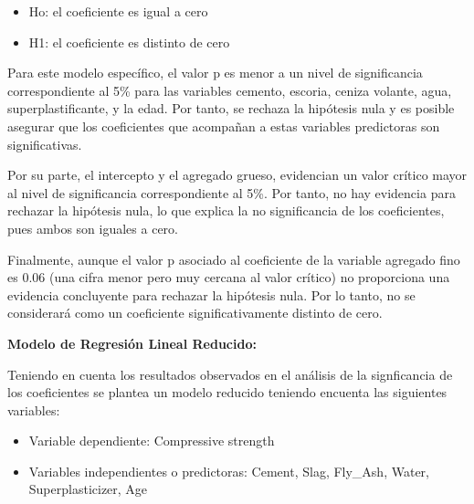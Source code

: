 \documentclass[11pt]{article}
\providecommand{\tightlist}{%
      \setlength{\itemsep}{0pt}\setlength{\parskip}{0pt}}
\begin{document}
\begin{itemize}
\tightlist
\item
  Ho: el coeficiente es igual a cero
\item
  H1: el coeficiente es distinto de cero
\end{itemize}

Para este modelo específico, el valor p es menor a un nivel de
significancia correspondiente al 5\% para las variables cemento,
escoria, ceniza volante, agua, superplastificante, y la edad. Por tanto,
se rechaza la hipótesis nula y es posible asegurar que los coeficientes
que acompañan a estas variables predictoras son significativas.

Por su parte, el intercepto y el agregado grueso, evidencian un valor
crítico mayor al nivel de significancia correspondiente al 5\%. Por
tanto, no hay evidencia para rechazar la hipótesis nula, lo que explica
la no significancia de los coeficientes, pues ambos son iguales a cero.

Finalmente, aunque el valor p asociado al coeficiente de la variable
agregado fino es 0.06 (una cifra menor pero muy cercana al valor
crítico) no proporciona una evidencia concluyente para rechazar la
hipótesis nula. Por lo tanto, no se considerará como un coeficiente
significativamente distinto de cero.

    \textbf{Modelo de Regresión Lineal Reducido:}

Teniendo en cuenta los resultados observados en el análisis de la
signficancia de los coeficientes se plantea un modelo reducido teniendo
encuenta las siguientes variables:

\begin{itemize}
\tightlist
\item
  Variable dependiente: Compressive strength
\item
  Variables independientes o predictoras: Cement, Slag, Fly\_Ash, Water,
  Superplasticizer, Age
\end{itemize}
\end{document}
